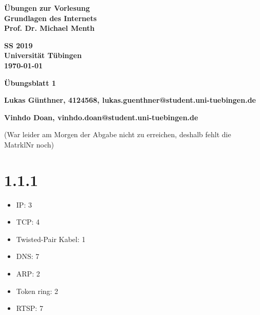 \documentclass[a4paper,url]{article}
\begin{document}
\newcommand{\nat}{\mbox{I}\!\mbox{N}}

\newcommand{\real}{\mbox{I}\!\mbox{R}}

\setcounter{aufgabe_count}{1}
\newcommand{\aufgabe}[2]{\vspace{3.5ex} {\noindent \bf\large Aufgabe
\arabic{aufgabe_count}: \hspace{10pt}#1} \hspace{5pt}(#2 Punkte)\vspace{3pt}\\ 
\stepcounter{aufgabe_count} 
}


\baselineskip

\pagestyle{plain}

\noindent
\begin{minipage}[t]{0.6\textwidth}
\begin{flushleft}
\bf Übungen zur Vorlesung\\
Grundlagen des Internets\\
Prof. Dr. Michael Menth
\end{flushleft}
\end{minipage}
\begin{minipage}[t]{0.4\textwidth}
\begin{flushright}
\bf SS 2019\\
Universität Tübingen\\
\today %
\end{flushright}
\end{minipage}



\vspace{5.0ex}
\noindent

\centerline{\huge \bf Übungsblatt 1}
\centerline{\bf Lukas Günthner, 4124568, lukas.guenthner@student.uni-tuebingen.de}
\centerline{\bf Vinhdo Doan, vinhdo.doan@student.uni-tuebingen.de}
	\centerline{(War leider am Morgen der Abgabe nicht zu erreichen, deshalb fehlt die MatrklNr noch)}
\section*{1.1.1}
\begin{itemize}
	\item IP: 3
	\item TCP: 4
	\item Twisted-Pair Kabel: 1
	\item DNS: 7
	\item ARP: 2
	\item Token ring: 2
	\item RTSP: 7
\end{itemize}
\end{document}
